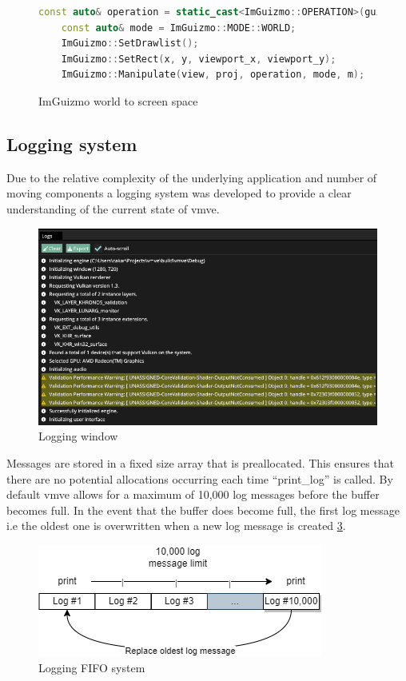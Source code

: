 \documentclass[11pt]{article}
\begin{document}
\begin{figure}[ht]
  \centering
  \begin{lstlisting}[language=C++]
    const auto& operation = static_cast<ImGuizmo::OPERATION>(guizmo_operation);
    const auto& mode = ImGuizmo::MODE::WORLD;
    ImGuizmo::SetDrawlist();
    ImGuizmo::SetRect(x, y, viewport_x, viewport_y);
    ImGuizmo::Manipulate(view, proj, operation, mode, m);
  \end{lstlisting}
  \caption{ImGuizmo world to screen space}
  \label{fig:imguizmo_code}
\end{figure}

\subsection{Logging system}
Due to the relative complexity of the underlying application and number of
moving components a logging system was developed to provide a clear
understanding of the current state of \gls{vmve}. 

\begin{figure}[h!]
  \centering
  \includegraphics[width=\textwidth]{images/logging_window.png}
  \caption{Logging window}
  \label{fig:logging_window}
\end{figure}

Messages are stored in a fixed size array that is preallocated. This ensures
that there are no potential allocations occurring each time ``print\_log''  is
called. By default \gls{vmve} allows for a maximum of 10,000 log messages before
the buffer becomes full. In the event that the buffer does become full, the
first log message i.e the oldest one is overwritten when a new log message is
created \ref{fig:logging_system}. 

\begin{figure}[h!]
  \centering
  \includegraphics[width=\textwidth]{images/logging.png}
  \caption{Logging FIFO system}
  \label{fig:logging_system}
\end{figure}
\end{document}

